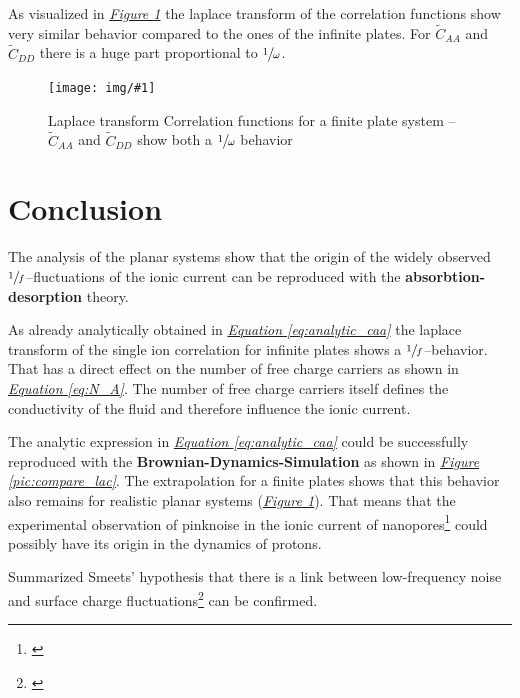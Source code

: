 \documentclass[a4paper, parskip=half]{scrartcl}
\newcommand{\effect}[1]{%
	\textbf{#1}%
}
\newcommand{\myImage}[2]{
	\begin{figure}[H]
	\centering
	\texttt{[image: img/\#1]}
	\caption{#2}
	\label{pic:#1}
	\end{figure}
}
\newcommand{\myFigRef}[1]{\textit{\hyperref[#1]{Figure \ref*{#1}}}}
\newcommand{\myEqRef}[1]{\textit{\hyperref[eq:#1]{Equation \ref*{eq:#1}}}}
\newcommand{\myCite}[1]{\footnote{\cite{#1} \citeauthor{#1} \citetitle{#1} \citeyear{#1}}}
\begin{document}
As visualized in \myFigRef{pic:limited_correlation_laplace} the laplace transform of the correlation functions show very similar behavior compared to the ones of the infinite plates. For $\widetilde{C}_{AA}$ and $\widetilde{C}_{DD}$ there is a huge part proportional to $\sfrac{1}{\omega}$.

\myImage{limited_correlation_laplace}{Laplace transform Correlation functions for a finite plate system -- $\widetilde{C}_{AA}$ and $\widetilde{C}_{DD}$ show both a $\sfrac{1}{\omega}$ behavior}

\newpage
\section{Conclusion}

The analysis of the planar systems show that the origin of the widely observed $\sfrac{1}{f}$--fluctuations of the ionic current can be reproduced with the \effect{absorbtion-desorption} theory.

As already analytically obtained in \myEqRef{analytic_caa} the laplace transform of the single ion correlation for infinite plates shows a $\sfrac{1}{f}$--behavior. That has a direct effect on the number of free charge carriers as shown in \myEqRef{N_A}. The number of free charge carriers itself defines the conductivity of the fluid and therefore influence the ionic current.

The analytic expression in \myEqRef{analytic_caa} could be successfully reproduced with the \effect{Brownian-Dynamics-Simulation} as shown in \myFigRef{pic:compare_lac}. The extrapolation for a finite plates shows that this behavior also remains for realistic planar systems (\myFigRef{pic:limited_correlation_laplace}). That means that the experimental observation of pinknoise in the ionic current of nanopores\myCite{pinknoise} could possibly have its origin in the dynamics of protons.

Summarized Smeets' hypothesis that there is a link between low-frequency noise and surface charge fluctuations\myCite{paper0} can be confirmed.

\newpage
\end{document}
